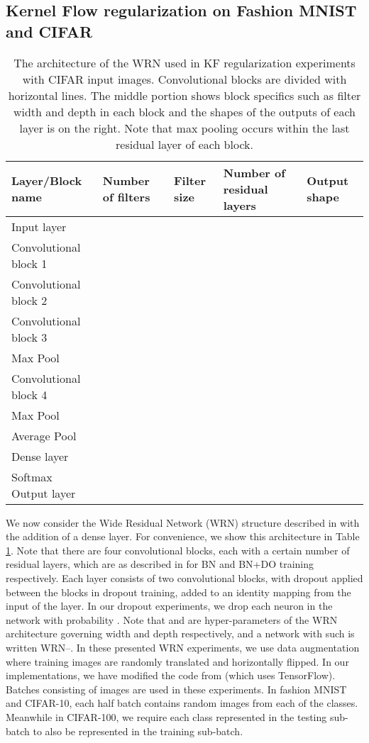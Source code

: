 \documentclass[11pt]{article}
\begin{document}
\subsection{Kernel Flow regularization on Fashion MNIST and CIFAR}

\begin{table}
{\scriptsize
\begin{center}
\begin{tabular}{ | p{3.8cm} || p{1.9cm} p{1.9cm} p{2.3cm} | p{2.5cm} |}
\hline
\textbf{Layer/Block name} & \textbf{Number of filters} & \textbf{Filter size} & \textbf{Number of residual layers} & \textbf{Output shape} \\
\hline
Input layer & & & & \\
\hline
Convolutional block 1 &  &  &  & \\
\hline
Convolutional block 2 &  &  &  & \\
\hline
Convolutional block 3 &  &  &  & \\
Max Pool & &  & & \\
\hline
Convolutional block 4 &  &  &  & \\
Max Pool & &  & &  \\
Average Pool & &  & & \\
\hline
Dense layer & & & & \\
\hline
Softmax Output layer & & & & \\
\hline
\end{tabular}
\end{center}}
\caption{The architecture of the WRN used in KF regularization experiments with CIFAR input images.  Convolutional blocks are divided with horizontal lines.  The middle portion shows block specifics such as filter width and depth in each block and the shapes of the outputs of each layer is on the right.  Note that max pooling occurs within the last residual layer of each block.}\label{WRN arch}
\end{table}

We now consider the Wide Residual Network (WRN) structure  described in \cite[Table 1]{WRNZagKom} with the addition of a dense layer.  For convenience, we show this architecture in Table \ref{WRN arch}.  Note that there are four convolutional blocks, each with a certain number of residual layers, which are as described in \cite[Fig. 1c,d]{WRNZagKom} for BN and BN+DO training respectively.  Each layer consists of two convolutional blocks, with dropout applied between the blocks in dropout training, added to an identity mapping from the input of the layer.  In our dropout experiments, we drop each neuron in the network with probability .  Note that  and  are hyper-parameters of the WRN architecture governing width and depth respectively, and a network with such  is written WRN--.  In these presented WRN experiments, we use data augmentation where training images are randomly translated and horizontally flipped.  In our implementations, we have modified the code from \cite{WRNTF} (which uses TensorFlow).  Batches consisting of  images are used in these experiments.  In fashion MNIST and CIFAR-10, each half batch contains  random images from each of the  classes.  Meanwhile in CIFAR-100, we require each class represented in the testing sub-batch to also be represented in the training sub-batch. 
\end{document}
